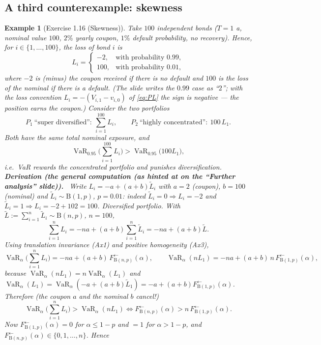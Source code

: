 \documentclass[11pt,a4paper]{article}
\newtheorem{example}{Example}
\newcommand{\VaR}{\operatorname{VaR}}
\newcommand{\der}[1]{\medskip\noindent\textbf{Derivation (#1).}\ }
\begin{document}
\subsection{A third counterexample: skewness}
\begin{example}[Exercise 1.16 (Skewness)]
Take $100$ independent bonds ($T=1$ a, nominal value $100$, $2\%$ yearly coupon, $1\%$ default
probability, no recovery). Hence, for $i\in\{1,\dots,100\}$, the loss of bond $i$ is
\[
  L_i=\begin{cases}-2,&\text{with probability }0.99,\\ 100,&\text{with probability }0.01,\end{cases}
\]
where $-2$ is (minus) the coupon received if there is no default and $100$ is the loss of the nominal
if there is a default. (The slide writes the $0.99$ case as ``$2$''; with the loss convention
$L_i=-(V_{i,1}-v_{i,0})$ of \eqref{eq:PL} the sign is negative --- the position earns the coupon.)
Consider the two portfolios
\[
  P_1\ \text{``super diversified''}:\ \sum_{i=1}^{100}L_i,
  \qquad
  P_2\ \text{``highly concentrated''}:\ 100\,L_1 .
\]
Both have the same total nominal exposure, and
\[
  \VaR_{0.95}\Big(\sum_{i=1}^{100}L_i\Big)>\VaR_{0.95}\big(100L_1\big),
\]
i.e.\ VaR rewards the concentrated portfolio and punishes diversification.
\der{the general computation (as hinted at on the ``Further analysis'' slide)}
Write $L_i=-a+(a+b)\tilde L_i$ with $a=2$ (coupon), $b=100$ (nominal) and
$\tilde L_i\sim\text{B}(1,p)$, $p=0.01$: indeed $\tilde L_i=0\Rightarrow L_i=-2$ and
$\tilde L_i=1\Rightarrow L_i=-2+102=100$. \emph{Diversified portfolio.} With
$\tilde L:=\sum_{i=1}^n\tilde L_i\sim\text{B}(n,p)$, $n=100$,
\[
  \sum_{i=1}^n L_i=-na+(a+b)\sum_{i=1}^n\tilde L_i=-na+(a+b)\tilde L .
\]
Using translation invariance (Ax1) and positive homogeneity (Ax3),
\[
  \VaR_\alpha\Big(\sum_{i=1}^n L_i\Big)=-na+(a+b)\,F^{\leftarrow}_{\text{B}(n,p)}(\alpha),
  \qquad
  \VaR_\alpha(nL_1)=-na+(a+b)\,n\,F^{\leftarrow}_{\text{B}(1,p)}(\alpha),
\]
because $\VaR_\alpha(nL_1)=n\VaR_\alpha(L_1)$ and
$\VaR_\alpha(L_1)=\VaR_\alpha(-a+(a+b)\tilde L_1)=-a+(a+b)F^{\leftarrow}_{\text{B}(1,p)}(\alpha)$.
Therefore (the coupon $a$ and the nominal $b$ cancel!)
\[
  \VaR_\alpha\Big(\sum_{i=1}^n L_i\Big)>\VaR_\alpha(nL_1)
  \iff F^{\leftarrow}_{\text{B}(n,p)}(\alpha)>n\,F^{\leftarrow}_{\text{B}(1,p)}(\alpha).
\]
Now $F^{\leftarrow}_{\text{B}(1,p)}(\alpha)=0$ for $\alpha\le1-p$ and $=1$ for $\alpha>1-p$, and
$F^{\leftarrow}_{\text{B}(n,p)}(\alpha)\in\{0,1,\dots,n\}$. Hence
\begin{itemize}[nosep]

\end{itemize}
\end{example}
\end{document}
